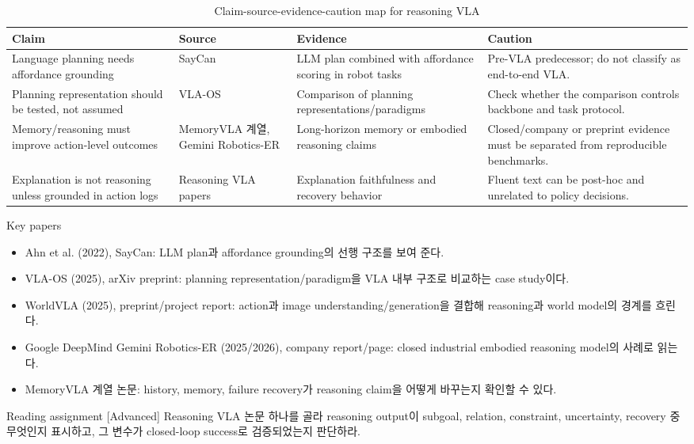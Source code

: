 \begin{table}[t]
  \centering
  \small
  \caption{Claim-source-evidence-caution map for reasoning VLA}
  \label{tab:ch9_claim_source}
  \begin{tabularx}{\textwidth}{L{31mm}L{30mm}L{46mm}Y}
    \toprule
    Claim & Source & Evidence & Caution \\
    \midrule
    Language planning needs affordance grounding & SayCan \citep{saycan} & LLM plan combined with affordance scoring in robot tasks & Pre-VLA predecessor; do not classify as end-to-end VLA. \\
    Planning representation should be tested, not assumed & VLA-OS \citep{vlaos} & Comparison of planning representations/paradigms & Check whether the comparison controls backbone and task protocol. \\
    Memory/reasoning must improve action-level outcomes & MemoryVLA 계열, Gemini Robotics-ER \citep{geminiroboticser} & Long-horizon memory or embodied reasoning claims & Closed/company or preprint evidence must be separated from reproducible benchmarks. \\
    Explanation is not reasoning unless grounded in action logs & Reasoning VLA papers & Explanation faithfulness and recovery behavior & Fluent text can be post-hoc and unrelated to policy decisions. \\
    \bottomrule
  \end{tabularx}
\end{table}

\begin{sourcebox}{Key papers}
\begin{itemize}
  \item Ahn et al. (2022), SayCan: LLM plan과 affordance grounding의 선행 구조를 보여 준다.
  \item VLA-OS (2025), arXiv preprint: planning representation/paradigm을 VLA 내부 구조로 비교하는 case study이다.
  \item WorldVLA (2025), preprint/project report: action과 image understanding/generation을 결합해 reasoning과 world model의 경계를 흐린다.
  \item Google DeepMind Gemini Robotics-ER (2025/2026), company report/page: closed industrial embodied reasoning model의 사례로 읽는다.
  \item MemoryVLA 계열 논문: history, memory, failure recovery가 reasoning claim을 어떻게 바꾸는지 확인할 수 있다.
\end{itemize}
\end{sourcebox}

\begin{assignmentbox}{Reading assignment [Advanced]}
Reasoning VLA 논문 하나를 골라 reasoning output이 subgoal, relation, constraint, uncertainty, recovery 중 무엇인지 표시하고, 그 변수가 closed-loop success로 검증되었는지 판단하라.
\end{assignmentbox}
